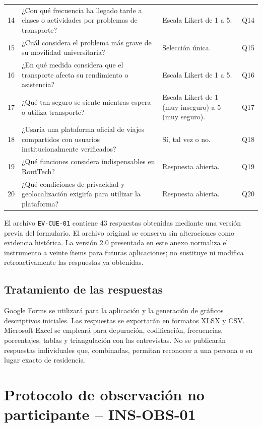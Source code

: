 \documentclass[10pt,a4paper]{article}
\begin{document}
\begin{longtable}{C{0.65cm} P{7.1cm} P{5.25cm} C{1.35cm}}
14 & ¿Con qué frecuencia ha llegado tarde a clases o actividades por problemas de transporte? & Escala Likert de 1 a 5. & Q14\\
15 & ¿Cuál considera el problema más grave de su movilidad universitaria? & Selección única. & Q15\\
16 & ¿En qué medida considera que el transporte afecta su rendimiento o asistencia? & Escala Likert de 1 a 5. & Q16\\
17 & ¿Qué tan seguro se siente mientras espera o utiliza transporte? & Escala Likert de 1 (muy inseguro) a 5 (muy seguro). & Q17\\
18 & ¿Usaría una plataforma oficial de viajes compartidos con usuarios institucionalmente verificados? & Sí, tal vez o no. & Q18\\
19 & ¿Qué funciones considera indispensables en RoutTech? & Respuesta abierta. & Q19\\
20 & ¿Qué condiciones de privacidad y geolocalización exigiría para utilizar la plataforma? & Respuesta abierta. & Q20\\
\end{longtable}
\endgroup

\begin{EthicsBox}
El archivo \texttt{EV-CUE-01} contiene 43 respuestas obtenidas mediante una versión previa del formulario. El archivo original se conserva sin alteraciones como evidencia histórica. La versión 2.0 presentada en este anexo normaliza el instrumento a veinte ítems para futuras aplicaciones; no sustituye ni modifica retroactivamente las respuestas ya obtenidas.
\end{EthicsBox}

\subsection{Tratamiento de las respuestas}

Google Forms se utilizará para la aplicación y la generación de gráficos descriptivos iniciales. Las respuestas se exportarán en formatos XLSX y CSV. Microsoft Excel se empleará para depuración, codificación, frecuencias, porcentajes, tablas y triangulación con las entrevistas. No se publicarán respuestas individuales que, combinadas, permitan reconocer a una persona o su lugar exacto de residencia.

\section{Protocolo de observación no participante -- INS-OBS-01}
\end{document}

